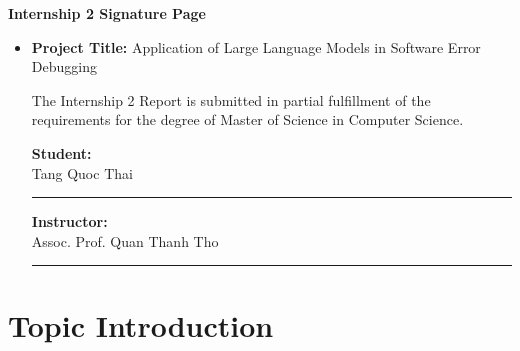 \documentclass[a4paper,oneside]{book}
\begin{document}
\newpage
\begin{titlepage}
\thispagestyle{empty}
\begin{center}
    \begin{large}
        \textbf{Internship 2 Signature Page}
    \end{large}
\end{center}
\vspace{1.2cm}
\begin{itemize}
    \item[] \textbf{Project Title:} Application of Large Language Models in Software Error Debugging
    \vspace{1cm}

    The Internship 2 Report is submitted in partial fulfillment of the requirements for the degree of Master of Science in Computer Science.
    \vspace{2cm}

    \begin{minipage}{0.5\textwidth}
        \textbf{Student:} \\[2cm]
        Tang Quoc Thai\\[0.25cm]
        \hrulefill
        \rule{7cm}{0.4pt}
    \end{minipage}
    \begin{minipage}{0.5\textwidth}
        \begin{flushright}
            \textbf{Instructor:} \\[2cm]
            Assoc. Prof. Quan Thanh Tho\\[0.25cm]
            \hrulefill
            \rule{7cm}{0.4pt}
        \end{flushright}
    \end{minipage}
    \vspace{1cm}
\end{itemize}
\end{titlepage}

\newpage
\tableofcontents

\newpage
\listoffigures

\newpage
\listoftables

\newpage
\chapter{Topic Introduction}
\end{document}
